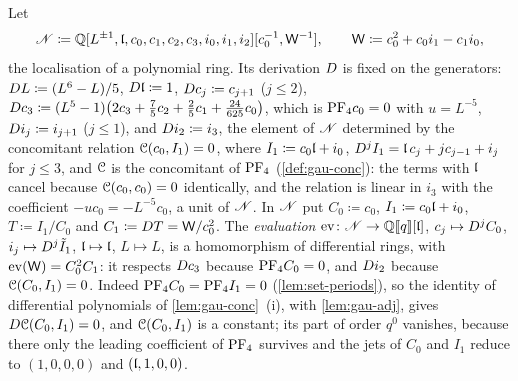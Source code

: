 \begin{defn}
\label{def:set-confexp}
Let
\[
\mathscr{N}\coloneqq\mathbb{Q}[L^{\pm1},\mathfrak{l},c_0,c_1,c_2,c_3,i_0,i_1,i_2][c_0^{-1},\mathsf W^{-1}],\qquad\mathsf W\coloneqq c_0^2+c_0i_1-c_1i_0,
\]
the localisation of a polynomial ring. Its derivation $D$ is fixed on the generators: $D L\coloneqq(L^6-L)/5$, $D\mathfrak{l}\coloneqq1$, $D c_j\coloneqq c_{j+1}$ ($j\leq2$), $D c_3\coloneqq(L^5-1)\bigl(2c_3+\frac75c_2+\frac25c_1+\frac{24}{625}c_0\bigr)$, which is $\mathrm{PF}_{4} c_0=0$ with $u=L^{-5}$, $D i_j\coloneqq i_{j+1}$ ($j\leq1$), and $D i_2\coloneqq i_3$, the element of $\mathscr{N}$ determined by the concomitant relation $\mathcal{C}(c_0,I_1)=0$, where $I_1\coloneqq c_0\mathfrak{l}+i_0$, $D^jI_1=\mathfrak{l}\,c_j+jc_{j-1}+i_j$ for $j\leq3$, and $\mathcal{C}$ is the concomitant of $\mathrm{PF}_{4}$ (\cref{def:gau-conc}): the terms with $\mathfrak{l}$ cancel because $\mathcal{C}(c_0,c_0)=0$ identically, and the relation is linear in $i_3$ with the coefficient $-uc_0=-L^{-5}c_0$, a unit of $\mathscr{N}$. In $\mathscr{N}$ put $C_0\coloneqq c_0$, $I_1\coloneqq c_0\mathfrak{l}+i_0$, $T\coloneqq I_1/C_0$ and $C_1\coloneqq D T=\mathsf W/c_0^2$. The \emph{evaluation} $\operatorname{ev}\colon\mathscr{N}\to\mathbb{Q}[\![ q ]\!][\mathfrak{l}]$, $c_j\mapsto D^jC_0$, $i_j\mapsto D^j\tilde I_1$, $\mathfrak{l}\mapsto\mathfrak{l}$, $L\mapsto L$, is a homomorphism of differential rings, with $\operatorname{ev}(\mathsf W)=C_0^2C_1$: it respects $D c_3$ because $\mathrm{PF}_{4} C_0=0$, and $D i_2$ because $\mathcal{C}(C_0,I_1)=0$. Indeed $\mathrm{PF}_{4} C_0=\mathrm{PF}_{4} I_1=0$ (\cref{lem:set-periods}), so the identity of differential polynomials of \cref{lem:gau-conc}~(i), with \cref{lem:gau-adj}, gives $D\mathcal{C}(C_0,I_1)=0$, and $\mathcal{C}(C_0,I_1)$ is a constant; its part of order $q^0$ vanishes, because there only the leading coefficient of $\mathrm{PF}_{4}$ survives and the jets of $C_0$ and $I_1$ reduce to $(1,0,0,0)$ and $(\mathfrak{l},1,0,0)$.


\end{defn}
